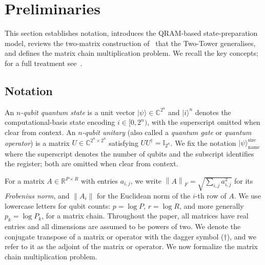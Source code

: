 \documentclass[a4paper,UKenglish,cleveref,autoref,thm-restate]{socg-lipics-v2021}
\providecommand{\ket}[1]{\lvert #1 \rangle}
\newcommand{\norm}[1]{\left\| #1 \right\|}
\newcommand{\Id}{\mathbb{I}}         %
\begin{document}
\section{Preliminaries}
\label{sec:prelim}

This section establishes notation, introduces the QRAM-based state-preparation model, reviews the two-matrix construction of~\cite{bernasconiMatMul} that the Two-Tower generalises, and defines the matrix chain multiplication problem. We recall the key concepts; for a full treatment see~\cite{nielsen2010quantum}.


\subsection{Notation}
\label{sec:prelim:notation}
An \emph{$n$-qubit quantum state} is a unit vector $\ket{\psi} \in \mathbb{C}^{2^n}$ and $\ket{i}^n$ denotes the computational-basis state encoding $i \in [0, 2^n)$, with the superscript omitted when clear from context. An \emph{$n$-qubit unitary} (also called a \emph{quantum gate} or \emph{quantum operator}) is a matrix $U \in \mathbb{C}^{2^n \times 2^n}$ satisfying $UU^\dagger = \Id_{2^n}$. We fix the notation $\ket{\psi}^{\mathrm{size}}_{\mathrm{name}}$ where the superscript denotes the number of qubits and the subscript identifies the register; both are omitted when clear from context.

For a matrix $A \in \mathbb{R}^{P \times R}$ with entries $a_{i,j}$,
we write $\norm{A}_F = \sqrt{\sum_{i,j} a_{i,j}^2}$ for its
\emph{Frobenius norm}, and $\norm{A_i}$ for the Euclidean norm of
the $i$-th row of $A$.
We use lowercase letters for qubit counts:
$p = \log P$, $r = \log R$, and more generally $p_k = \log P_k$,
for a matrix chain.
Throughout the paper, all matrices have real entries and all dimensions are
assumed to be powers of two. 
We denote the conjugate transpose of a matrix or operator with the dagger symbol ($\dagger$), and we refer to it as the adjoint of the matrix or operator.
We now formalize the matrix chain multiplication problem.
\end{document}
